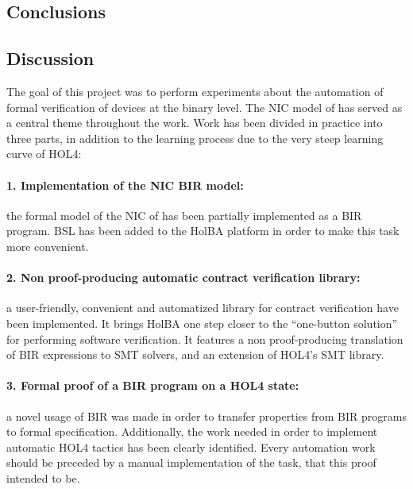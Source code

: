 \documentclass[10pt,a4paper]{article}
\begin{document}
\begin{multicols}{2}

\section{Conclusions}

\subsection{Discussion}

The goal of this project was to perform experiments about the automation of formal verification of devices at the binary level. The NIC model of \cite{haglund_formal_2016} has served as a central theme throughout the work. Work has been divided in practice into three parts, in addition to the learning process due to the very steep learning curve of HOL4:

\paragraph{1. Implementation of the NIC BIR model:} the formal model of the NIC of \cite{haglund_formal_2016} has been partially implemented as a BIR program. BSL has been added to the HolBA platform in order to make this task more convenient.

\paragraph{2. Non proof-producing automatic contract verification library:} a user-friendly, convenient and automatized library for contract verification have been implemented. It brings HolBA one step closer to the ``one-button solution'' for performing software verification. It features a non proof-producing translation of BIR expressions to SMT solvers, and an extension of HOL4's SMT library.

\paragraph{3. Formal proof of a BIR program on a HOL4 state:} a novel usage of BIR was made in order to transfer properties from BIR programs to formal specification. Additionally, the work needed in order to implement automatic HOL4 tactics has been clearly identified. Every automation work should be preceded by a manual implementation of the task, that this proof intended to be.
\bigskip


\end{multicols}
\end{document}
